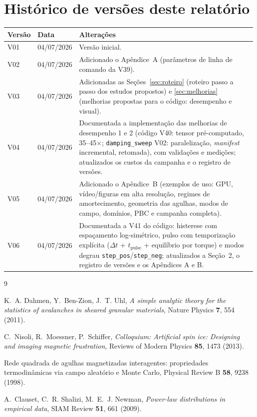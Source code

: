 \documentclass[11pt,a4paper]{article}
\newcommand{\code}[1]{\texttt{#1}}
\begin{document}
\section*{Histórico de versões deste relatório}

\begin{tabular}{@{}lll@{}}
\toprule
\textbf{Versão} & \textbf{Data} & \textbf{Alterações} \\
\midrule
V01 & 04/07/2026 & Versão inicial. \\
V02 & 04/07/2026 & Adicionado o Apêndice~A (parâmetros de linha de
comando da V39). \\
V03 & 04/07/2026 & Adicionadas as Seções~\ref{sec:roteiro} (roteiro
passo a passo dos estudos propostos) e \ref{sec:melhorias} (melhorias
propostas para o código: desempenho e visual). \\
V04 & 04/07/2026 & Documentada a implementação das melhorias de
desempenho 1 e 2 (código V40: tensor pré-computado, 35--45$\times$;
\code{damping\_sweep} V02: paralelização, \emph{manifest} incremental,
retomada), com validações e medições; atualizados os custos da campanha
e o registro de versões. \\
V05 & 04/07/2026 & Adicionado o Apêndice~B (exemplos de uso: GPU,
vídeo/figuras em alta resolução, regimes de amortecimento, geometria das
agulhas, modos de campo, domínios, PBC e campanha completa). \\
V06 & 04/07/2026 & Documentada a V41 do código: histerese com
espaçamento log-simétrico, pulso com temporização explícita
($\Delta t$ + $t_{\mathrm{pulse}}$ + equilíbrio por torque) e modos
degrau \code{step\_pos}/\code{step\_neg}; atualizados a Seção~2, o
registro de versões e os Apêndices A e B. \\
\bottomrule
\end{tabular}

\begin{thebibliography}{9}

K.~A. Dahmen, Y.~Ben-Zion, J.~T. Uhl,
\emph{A simple analytic theory for the statistics of avalanches in
sheared granular materials},
Nature Physics \textbf{7}, 554 (2011).

C.~Nisoli, R.~Moessner, P.~Schiffer,
\emph{Colloquium: Artificial spin ice: Designing and imaging magnetic
frustration},
Reviews of Modern Physics \textbf{85}, 1473 (2013).

Rede quadrada de agulhas magnetizadas interagentes: propriedades
termodinâmicas via campo aleatório e Monte Carlo,
Physical Review B \textbf{58}, 9238 (1998).

A.~Clauset, C.~R. Shalizi, M.~E.~J. Newman,
\emph{Power-law distributions in empirical data},
SIAM Review \textbf{51}, 661 (2009).

\end{thebibliography}
\end{document}
